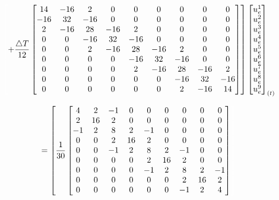 \documentclass{article} %
\begin{document}
\begin{equation*}
\color{white}\left[\color{black}+\frac{\triangle T}{12}\begin{bmatrix}
14&-16 & 2& 0& 0& 0& 0& 0& 0\\
-16& 32& -16& 0& 0& 0& 0& 0& 0\\
2&-16&28&-16& 2& 0& 0& 0& 0\\
0&0& -16&32& -16& 0& 0& 0& 0\\
0&0&2&-16& 28&-16&2& 0& 0\\
0&0&0&0& -16&32&-16& 0& 0\\
0&0&0&0&2&-16&28&-16&2\\
0&0&0&0&0&0&-16&32&-16\\
0&0&0&0&0&0&2&-16&14
\end{bmatrix}\right]\color{black}\begin{bmatrix}
u_e^1\\
u_e^2\\
u_e^3\\
u_e^4\\
u_e^5\\
u_e^6\\
u_e^7\\
u_e^8\\
u_e^9
\end{bmatrix}_{(t)}
\end{equation*}


\begin{equation*}
=\left[\frac{1}{30}\begin{bmatrix}
4&2 & -1& 0& 0& 0& 0& 0& 0\\
2& 16& 2& 0& 0& 0& 0& 0& 0\\
-1&2&8&2& -1& 0& 0& 0& 0\\
0&0& 2&16& 2& 0& 0& 0& 0\\
0&0&-1& 2& 8&2&-1& 0& 0\\
0&0&0&0& 2&16&2& 0& 0\\
0&0&0&0&-1&2&8&2&-1\\
0&0&0&0&0&0&2&16&2\\
0&0&0&0&0&0&-1&2&4
\end{bmatrix}\color{white}\right]\color{black}
\end{equation*}
\end{document}
